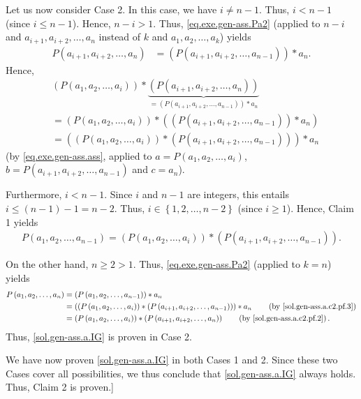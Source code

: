 \documentclass[paper=a4, fontsize=12pt]{scrartcl} %
\newcommand{\set}[1]{\left\{ #1 \right\}}
\newcommand{\tup}[1]{\left( #1 \right)}
\newcommand{\nnn}{\nonumber\\} %
\theoremstyle{plainsl}
\theoremstyle{definition}
\theoremstyle{remark}
\begin{document}
Let us now consider Case 2.
In this case, we have $i \neq n-1$.
Thus, $i < n-1$ (since $i \leq n-1$).
Hence, $n-i > 1$.
Thus, \eqref{eq.exe.gen-ass.Pa2} (applied to $n-i$
and $a_{i+1}, a_{i+2}, \ldots, a_n$ instead of $k$
and $a_1, a_2, \ldots, a_k$)
yields
\begin{align*}
P \tup{a_{i+1}, a_{i+2}, \ldots, a_n}
&= \tup{P \tup{a_{i+1}, a_{i+2}, \ldots, a_{n-1}}} * a_n  .
\end{align*}
Hence,
\begin{align}
& \tup{P \tup{a_1, a_2, \ldots, a_i}}
     * \underbrace{\tup{P \tup{a_{i+1}, a_{i+2}, \ldots, a_n}}}_{
                    = \tup{P \tup{a_{i+1}, a_{i+2}, \ldots, a_{n-1}}} * a_n} \nnn
& = \tup{P \tup{a_1, a_2, \ldots, a_i}}
     * \tup{\tup{P \tup{a_{i+1}, a_{i+2}, \ldots, a_{n-1}}} * a_n} \nnn
& = \tup{\tup{P \tup{a_1, a_2, \ldots, a_i}}
     * \tup{P \tup{a_{i+1}, a_{i+2}, \ldots, a_{n-1}}}}
    * a_n
\label{sol.gen-ass.a.c2.pf.2}
\end{align}
(by \eqref{eq.exe.gen-ass.ass}, applied to
$a = P \tup{a_1, a_2, \ldots, a_i}$,
$b = P \tup{a_{i+1}, a_{i+2}, \ldots, a_{n-1}}$
and $c = a_n$).

Furthermore, $i < n-1$.
Since $i$ and $n-1$ are integers, this entails
$i \leq \tup{n-1} - 1 = n-2$.
Thus, $i \in \set{1, 2, \ldots, n-2}$ (since $i \geq 1$).
Hence, Claim 1 yields
\begin{align}
P \tup{a_1, a_2, \ldots, a_{n-1}}
= \tup{P \tup{a_1, a_2, \ldots, a_i}}
     * \tup{P \tup{a_{i+1}, a_{i+2}, \ldots, a_{n-1}}} .
\label{sol.gen-ass.a.c2.pf.3}
\end{align}

On the other hand, $n \geq 2 > 1$.
Thus, \eqref{eq.exe.gen-ass.Pa2} (applied to $k = n$)
yields
\begin{align*}
P \tup{a_1, a_2, \ldots, a_n}
&= \tup{P \tup{a_1, a_2, \ldots, a_{n-1}}} * a_n \\
&= \tup{\tup{P \tup{a_1, a_2, \ldots, a_i}}
     * \tup{P \tup{a_{i+1}, a_{i+2}, \ldots, a_{n-1}}}}
    * a_n
    \qquad
    \tup{\text{by \eqref{sol.gen-ass.a.c2.pf.3}}} \\
&= \tup{P \tup{a_1, a_2, \ldots, a_i}}
     * \tup{P \tup{a_{i+1}, a_{i+2}, \ldots, a_n}}
     \qquad \tup{\text{by \eqref{sol.gen-ass.a.c2.pf.2}}} .
\end{align*}
Thus, \eqref{sol.gen-ass.a.IG} is proven in Case 2.

We have now proven \eqref{sol.gen-ass.a.IG} in both Cases
1 and 2.
Since these two Cases cover all possibilities, we thus
conclude that \eqref{sol.gen-ass.a.IG} always holds.
Thus, Claim 2 is proven.]
\end{document}

